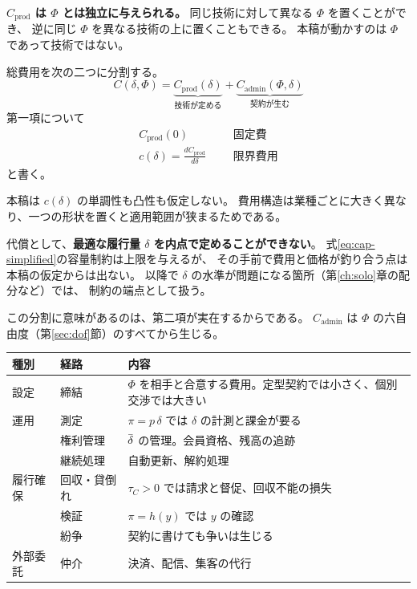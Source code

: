 \textbf{$C_{\mathrm{prod}}$ は $\Phi$ とは独立に与えられる。}
同じ技術に対して異なる $\Phi$ を置くことができ、
逆に同じ $\Phi$ を異なる技術の上に置くこともできる。
本稿が動かすのは $\Phi$ であって技術ではない。

\begin{definition}[費用の分割]
\label{def:cost}
総費用を次の二つに分割する。
\begin{equation}
C(\delta,\Phi) = \underbrace{C_{\mathrm{prod}}(\delta)}_{\text{技術が定める}}
 + \underbrace{C_{\mathrm{admin}}(\Phi,\delta)}_{\text{契約が生む}}
\label{eq:cost-split}
\end{equation}
第一項について
\begin{align}
C_{\mathrm{prod}}(0) && &\text{固定費} \\
c(\delta) = \frac{dC_{\mathrm{prod}}}{d\delta} && &\text{限界費用}
\end{align}
と書く。
\end{definition}

\begin{remark}
本稿は $c(\delta)$ の単調性も凸性も仮定しない。
費用構造は業種ごとに大きく異なり、一つの形状を置くと適用範囲が狭まるためである。

代償として、\textbf{最適な履行量 $\delta$ を内点で定めることができない}。
式\eqref{eq:cap-simplified}の容量制約は上限を与えるが、
その手前で費用と価格が釣り合う点は本稿の仮定からは出ない。
以降で $\delta$ の水準が問題になる箇所（第\ref{ch:solo}章の配分など）では、
制約の端点として扱う。
\end{remark}

この分割に意味があるのは、第二項が実在するからである。
$C_{\mathrm{admin}}$ は $\Phi$ の六自由度（第\ref{sec:dof}節）のすべてから生じる。

\begin{center}
\begin{tabularx}{\textwidth}{@{}llX@{}}
\toprule
種別 & 経路 & 内容 \\
\midrule
設定 & 締結 & $\Phi$ を相手と合意する費用。定型契約では小さく、個別交渉では大きい \\
運用 & 測定 & $\pi=p\,\delta$ では $\delta$ の計測と課金が要る \\
 & 権利管理 & $\dbar$ の管理。会員資格、残高の追跡 \\
 & 継続処理 & 自動更新、解約処理 \\
履行確保 & 回収・貸倒れ & $\tau_C>0$ では請求と督促、回収不能の損失 \\
 & 検証 & $\pi=h(y)$ では $y$ の確認 \\
 & 紛争 & 契約に書けても争いは生じる \\
外部委託 & 仲介 & 決済、配信、集客の代行 \\
\bottomrule
\end{tabularx}
\label{tab:cadmin-routes}
\end{center}

